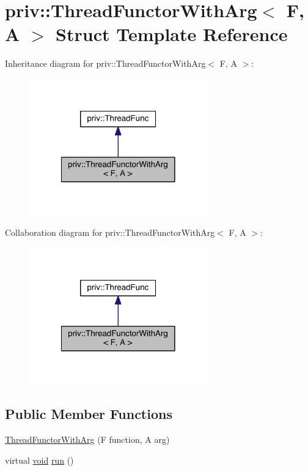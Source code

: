 \hypertarget{structpriv_1_1_thread_functor_with_arg}{\section{priv\-:\-:Thread\-Functor\-With\-Arg$<$ F, A $>$ Struct Template Reference}
\label{structpriv_1_1_thread_functor_with_arg}
}


Inheritance diagram for priv\-:\-:Thread\-Functor\-With\-Arg$<$ F, A $>$\-:
\nopagebreak
\begin{figure}[H]
\begin{center}
\leavevmode
\includegraphics[width=218pt]{structpriv_1_1_thread_functor_with_arg__inherit__graph}
\end{center}
\end{figure}


Collaboration diagram for priv\-:\-:Thread\-Functor\-With\-Arg$<$ F, A $>$\-:
\nopagebreak
\begin{figure}[H]
\begin{center}
\leavevmode
\includegraphics[width=218pt]{structpriv_1_1_thread_functor_with_arg__coll__graph}
\end{center}
\end{figure}
\subsection*{Public Member Functions}
\begin{DoxyCompactItemize}
\item 
\hyperlink{structpriv_1_1_thread_functor_with_arg_ae3745753b77880cdfda6f10d72748efa}{Thread\-Functor\-With\-Arg} (F function, A arg)
\item 
virtual \hyperlink{glutf90_8h_ac778d6f63f1aaf8ebda0ce6ac821b56e}{void} \hyperlink{structpriv_1_1_thread_functor_with_arg_a0f8bb6ba36819e80016528bab8b0bd4f}{run} ()
\end{DoxyCompactItemize}
